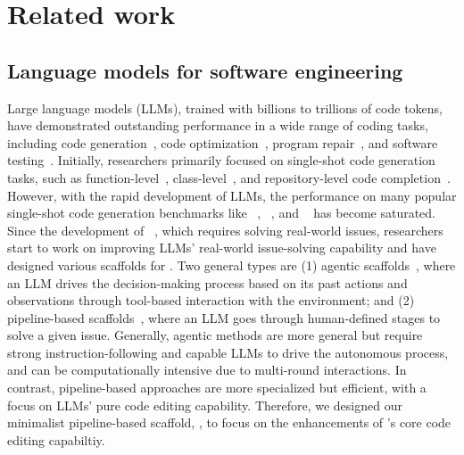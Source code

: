 \section{Related work}
\label{section:related-work}

\subsection{Language models for software engineering}
Large language models (LLMs), trained with billions to trillions of code tokens, have demonstrated outstanding performance in a wide range of coding tasks, including
code generation~\cite{codex,starcoder,codellama,dscoder,magicoder,starcoder2,dscoderv2},
code optimization~\cite{cummins2024metalargelanguagemodel,evalperf},
program repair~\cite{alpharepair,aprstudy,aprstudy2,repilot},
and software testing~\cite{fuzz4all,titanfuzz,yuan2023no,schafer2023empirical,lemieux2023codamosa}.
Initially, researchers primarily focused on single-shot code generation tasks, such as function-level~\cite{codex,mbpp,apps,codecontests,lcb}, class-level~\cite{classeval}, and repository-level code completion~\cite{cceval,repobench,repocoder}. However, with the rapid development of LLMs, the performance on many popular single-shot code generation benchmarks like \humaneval~\cite{codex}, \mbpp~\cite{mbpp}, and \evalplus~\cite{liu2023code} has become saturated.
Since the development of \swebench~\cite{swebench}, which requires solving real-world \github issues, researchers start to work on improving LLMs' real-world issue-solving capability and have designed various scaffolds for \swebench.
Two general types are
(1) agentic scaffolds~\cite{sweagent,openhands,aider}, where an LLM drives the decision-making process based on its past actions and observations through tool-based interaction with the environment;
and (2) pipeline-based scaffolds~\cite{agentless,moatless,autocoderover}, where an LLM goes through human-defined stages to solve a given issue.
Generally, agentic methods are more general but require strong instruction-following and capable LLMs to drive the autonomous process, and can be computationally intensive due to multi-round interactions. In contrast, pipeline-based approaches are more specialized but efficient, with a focus on LLMs' pure code editing capability.
Therefore, we designed our minimalist pipeline-based scaffold, \ouragentless, to focus on the enhancements of \ours's core code editing capabiltiy.


